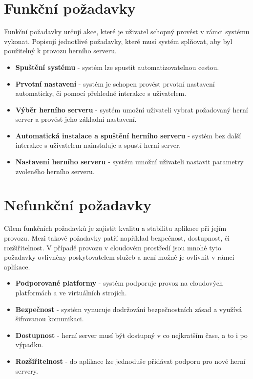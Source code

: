 \section{Funkční požadavky}

Funkční požadavky určují akce, které je uživatel schopný provést v rámci systému vykonat.
Popisují jednotlivé požadavky, které musí systém splňovat, aby byl použitelný k provozu herního serveru.

\begin{itemize}
    \item \textbf{Spuštění systému} - systém lze spustit automatizovatelnou cestou.
    \item \textbf{Prvotní nastavení} - systém je schopen provést prvotní nastavení automaticky, či pomocí přehledné interakce s uživatelem. 
    \item \textbf{Výběr herního serveru} - systém umožní uživateli vybrat požadovaný herní server a provést jeho základní nastavení.
    \item \textbf{Automatická instalace a spuštění herního serveru} - systém bez další interakce s uživatelem nainstaluje a spustí herní server.
    \item \textbf{Nastavení herního serveru} - systém umožní uživateli nastavit parametry zvoleného herního serveru.
\end{itemize}

\section{Nefunkční požadavky}

Cílem funkčních požadavků je zajistit kvalitu a stabilitu aplikace při jejím provozu. Mezi takové požadavky patří například bezpečnost, dostupnost, či rozšiřitelnost.
V případě provozu v cloudovém prostředí jsou mnohé tyto požadavky ovlivněny poskytovatelem služeb a není možné je ovlivnit v rámci aplikace.

\begin{itemize}
    \item \textbf{Podporované platformy} - systém podporuje provoz na cloudových platformách a ve virtuálních strojích.
    \item \textbf{Bezpečnost} - systém vynucuje dodržování bezpečnostních zásad a využívá šifrovanou komunikaci.
    \item \textbf{Dostupnost} - herní server musí být dostupný v co nejkratším čase, a to i po výpadku.
    \item \textbf{Rozšiřitelnost} - do aplikace lze jednoduše přidávat podporu pro nové herní servery.
\end{itemize}

